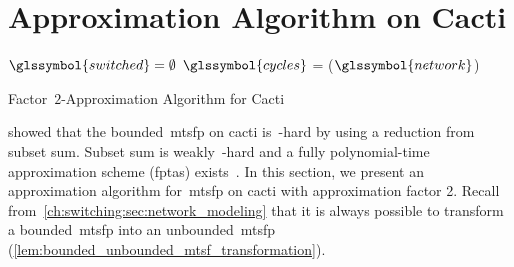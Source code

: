 \section{Approximation Algorithm on Cacti}
\label{ch:switching:sec:approximation_algorithm_on_cacti}
%
\begin{algorithm}[tb!]
\SetAlgoLined
  $\glssymbol{switched} = \emptyset$\;
  $\glssymbol{cycles}$ = \algodfs($\glssymbol{network}$)\;
  \;
  \caption{Factor~$2$-Approximation Algorithm for Cacti}
  \label{ch:switching:sec:approximation_algorithm_on_cacti:alg:factor_2_approximation}
\end{algorithm}
%
% 
\textcite{Leh14} showed that the bounded~\gls{mtsfp} on cacti is~\NP-hard by
using a reduction from subset sum. Subset sum is weakly~\NP-hard and a fully
polynomial-time approximation scheme (\gls{fptas})
exists~\parencite{krps-fptasSubsetSum-2003}.
% 
In this section, we present an approximation algorithm for~\gls{mtsfp} on
cacti with approximation factor 2. Recall
from~\cref{ch:switching:sec:network_modeling} that it is always possible to
transform a bounded~\gls{mtsfp} into an unbounded~\gls{mtsfp}
(\cref{lem:bounded_unbounded_mtsf_transformation}).

